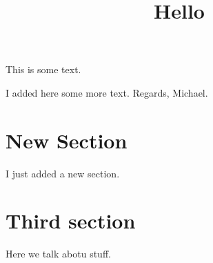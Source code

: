 \documentclass{article}
\title{Hello}
\begin{document}
\maketitle
	
This is some text.

I added here some more text.
Regards, Michael.

\section{New Section}

I just added a new section. 


\section{Third section}

Here we talk abotu stuff. 
\end{document}
